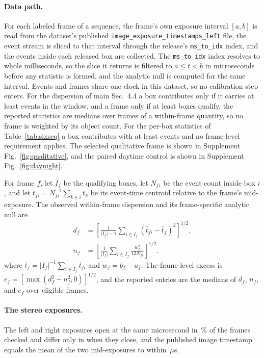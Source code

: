 \documentclass[10pt,twocolumn,letterpaper]{article}
\newcommand{\micro}{\ensuremath{\mu}}
\begin{document}
\paragraph{Data path.} For each labeled frame of a sequence, the frame's own
exposure interval $[a,b]$ is read from the dataset's published
\texttt{image\_exposure\_timestamps\_left} file, the event stream is sliced to
that interval through the release's \texttt{ms\_to\_idx} index, and the events
inside each released box are collected. The \texttt{ms\_to\_idx} index resolves to
whole milliseconds, so the slice it returns is filtered to $a\le t<b$ in
microseconds before any statistic is formed, and the analytic null is computed for
the same interval. Events and frames share one clock in this dataset, so no
calibration step enters. For the dispersion of main Sec.~4.4 a box contributes
only if it carries at least \minEvents{} events in the window, and a frame only
if at least \minObjects{} boxes qualify, the reported statistics are medians over
frames of a within-frame quantity, so no frame is weighted by its object count.
For the per-box statistics of Table~\ref{tab:sixseq} a box contributes with at
least \sixMinEvents{} events and no frame-level requirement applies. The selected
qualitative frame is shown in Supplement Fig.~\ref{fig:qualitative}, and the paired
daytime control is shown in Supplement Fig.~\ref{fig:daynight}.

For frame $f$, let $I_f$ be the qualifying boxes, let $N_{fi}$ be the event count
inside box $i$, and let $\bar t_{fi}=N_{fi}^{-1}\sum_{k\in i}t_k$ be its event-time
centroid relative to the frame's mid-exposure. The observed within-frame dispersion
and its frame-specific analytic null are
\[
\begin{aligned}
d_f&=\left[\frac{1}{|I_f|-1}\sum_{i\in I_f}
 (\bar t_{fi}-\bar t_f)^2\right]^{1/2},\\
n_f&=\left[\frac{1}{|I_f|}\sum_{i\in I_f}
 \frac{w_f^2}{12N_{fi}}\right]^{1/2}.
\end{aligned}
\]
where $\bar t_f=|I_f|^{-1}\sum_{i\in I_f}\bar t_{fi}$ and $w_f=b_f-a_f$.
The frame-level excess is $e_f=[\max(d_f^2-n_f^2,0)]^{1/2}$, and the reported
entries are the medians of $d_f$, $n_f$, and $e_f$ over eligible frames.

\paragraph{The stereo exposures.} The left and right exposures open at the same microsecond
in \dsecCotriggerPct\,\% of the \dsecCotriggerFrames{} frames checked and differ only in
when they close, and the published image timestamp equals the mean of the two
mid-exposures to within \dsecTsResidual\,\micro s.
\end{document}

